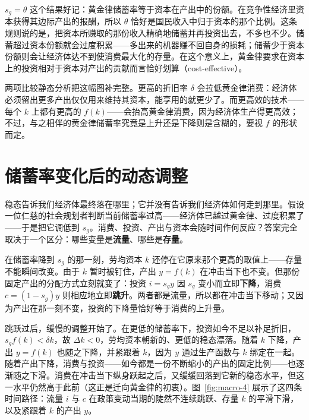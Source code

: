 $s_g = \theta$ 这个结果好记：黄金律储蓄率等于资本在产出中的份额。在竞争性经济里资本获得其边际产出的报酬，所以 $\theta$ 恰好是国民收入中归于资本的那个比例。这条规则说的是，把资本所赚取的那份收入精确地储蓄并再投资出去，不多也不少。储蓄超过资本份额就会过度积累——多出来的机器赚不回自身的损耗；储蓄少于资本份额则会让经济体达不到使消费最大化的存量。在这个意义上，黄金律要求在资本上的投资相对于资本对产出的贡献而言恰好划算（cost-effective）。

两项比较静态分析把这幅图补完整。更高的折旧率 $\delta$ 会拉低黄金律消费：经济体必须留出更多产出仅仅用来维持其资本，能享用的就更少了。而更高效的技术——每个 $k$ 上都有更高的 $f(k)$——会抬高黄金律消费，因为经济体生产得更高效；不过，与之相伴的黄金律储蓄率究竟是上升还是下降则是含糊的，要视 $f$ 的形状而定。

\section{储蓄率变化后的动态调整}

稳态告诉我们经济体最终落在哪里；它并没有告诉我们经济体如何走到那里。假设一位仁慈的社会规划者判断当前储蓄率过高——经济体已越过黄金律、过度积累了——于是把它调低到 $s_g$。消费、投资、产出与资本会随时间作何反应？答案完全取决于一个区分：哪些变量是\textbf{流量}、哪些是\textbf{存量}。


在储蓄率降到 $s_g$ 的那一刻，劳均资本 $k$ 还停在它原来那个更高的取值上——存量不能瞬间改变。由于 $k$ 暂时被钉住，产出 $y = f(k)$ 在冲击当下也不变。但那份固定产出的分配方式立刻就变了：投资 $i = s_g y$ 因 $s_g$ 变小而立即\textbf{下降}，消费 $c = (1 - s_g) y$ 则相应地立即\textbf{跳升}。两者都是流量，所以都在冲击当下移动；又因为产出在那一刻不变，投资的下降量恰好等于消费的上升量。

跳跃过后，缓慢的调整开始了。在更低的储蓄率下，投资如今不足以补足折旧，$s_g f(k) < \delta k$，故 $\Delta k < 0$，劳均资本朝新的、更低的稳态漂落。随着 $k$ 下降，产出 $y = f(k)$ 也随之下降，并紧跟着 $k$，因为 $y$ 通过生产函数与 $k$ 绑定在一起。随着产出下降，消费与投资——如今都是一份不断缩小的产出的固定比例——也逐渐随之下滑。消费在冲击当下纵身跃起之后，又缓缓回落到它新的稳态水平，但这一水平仍然高于此前（这正是迁向黄金律的初衷）。图~\ref{fig:macro-4} 展示了这四条时间路径：流量 $i$ 与 $c$ 在政策变动当期的陡然不连续跳跃、存量 $k$ 的平滑下滑，以及紧跟着 $k$ 的产出 $y$。

